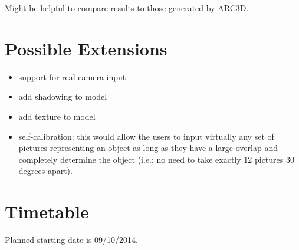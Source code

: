  Might be helpful to compare results to those generated by ARC3D.
 
\section*{Possible Extensions}
\begin{itemize}
\item support for real camera input
\item add shadowing to model
\item add texture to model
\item self-calibration: this would allow the users to input virtually any set of pictures representing an object as long as they have a large overlap and completely determine the object (i.e.: no need to take exactly 12 pictures 30 degrees apart).
\end{itemize}

\section*{Timetable}

Planned starting date is 09/10/2014.

